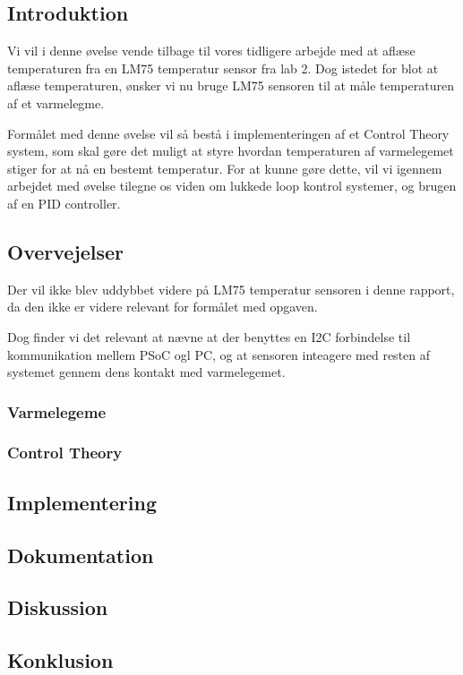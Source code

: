\documentclass[../main.tex]{subfiles}
\begin{document}
\subsection{Introduktion}
Vi vil i denne øvelse vende tilbage til vores tidligere arbejde med at aflæse temperaturen fra en LM75 temperatur sensor fra lab 2. Dog istedet for blot at aflæse temperaturen, ønsker vi nu bruge LM75 sensoren til at måle temperaturen af et varmelegme.

Formålet med denne øvelse vil så bestå i implementeringen af et Control Theory system, som skal gøre det muligt at styre hvordan temperaturen af varmelegemet stiger for at nå en bestemt temperatur. For at kunne gøre dette, vil vi igennem arbejdet med øvelse tilegne os viden om lukkede loop kontrol systemer, og brugen af en PID controller.

\subsection{Overvejelser}

Der vil ikke blev uddybbet videre på LM75 temperatur sensoren i denne rapport, da den ikke er videre relevant for formålet med opgaven.

Dog finder vi det relevant at nævne at der benyttes en I2C forbindelse til kommunikation mellem PSoC ogl PC, og at sensoren inteagere med resten af systemet gennem dens kontakt med varmelegemet.

\subsubsection{Varmelegeme}


\subsubsection{Control Theory}


\subsection{Implementering}

\subsection{Dokumentation}

\subsection{Diskussion}


\subsection{Konklusion}
\end{document}
